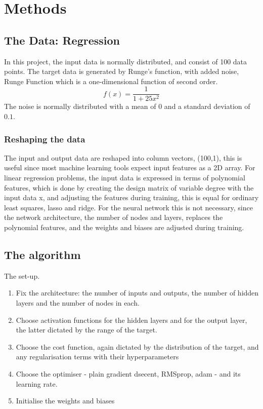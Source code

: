 \section{Methods}
\label{sec:methods}
\subsection{The Data: Regression}
In this project, the input data is normally distributed, and consist of 100 data points.
The target data is generated by Runge's function, with added noise,
Runge Function which is a one-dimensional function of second order.
\[
  f(x) = \frac{1}{1 + 25x^2}
\]
The noise is normally distributed with a mean of 0 and a 
standard deviation of $0.1$.  
\subsubsection{Reshaping the data}
The input and output data are reshaped into column vectors, (100,1),
this is useful since most machine learning tools expect input features
as a 2D array. 
For linear regression problems, the input data is expressed
in terms of polynomial features, which is done
by creating the design matrix of variable degree with the input data x,
and adjusting the features during training, this is equal for ordinary least squares, lasso and ridge. 
For the neural network this is not necessary, since the network architecture,
the number of nodes and layers, replaces the polynomial features, and the 
weights and biases are adjusted during training.  
\subsection{The algorithm}
The set-up.
\begin{enumerate}
    \item Fix the architecture: the number of inputs and outputs,
    the number of hidden layers and the number of nodes in each.
    \item Choose activation functions for the hidden layers and for the
    output layer, the latter dictated by the range of the target.
    \item Choose the cost function, again dictated by the distribution of the target,
    and any regularisation terms with their hyperparameters
    \item Choose the optimiser - plain gradient dsecent, RMSprop, adam -
    and its learning rate.
    \item Initialise the weights and biases
\end{enumerate}

